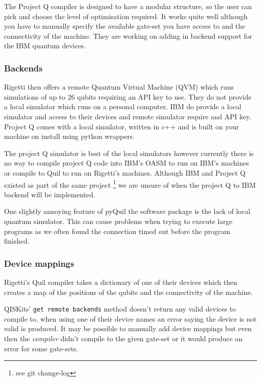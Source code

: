 The Project Q compiler is designed to have a modular structure, so the user can pick and choose the level of optimisation required. It works quite well although you have to manually specify the available gate-set you have access to and the connectivity of the machine. They are working on adding in backend support for the IBM quantum devices.


\subsubsection{Backends}

Rigetti then offers a remote Quantum Virtual Machine (QVM) which runs simulations of up to 26 qubits requiring an API key to use. They do not provide a local simulator which runs on a personal computer. IBM do provide a local simulator and access to their devices and remote simulator require and API key. Project Q comes with a local simulator, written in c++ and is built on your machine on install using python wrappers.

The project Q simulator is best of the local simulators however currently there is no way to compile project Q code into IBM's OASM to run on IBM's machines or compile to Quil to run on Rigetti's machines. Although IBM and Project Q existed as part of the same project \footnote{see git change-log} we are unsure of when the project Q to IBM backend will be implemented. 

One slightly annoying feature of pyQuil the software package is the lack of local quantum simulator. This can cause problems when trying to execute large programs as we often found the connection timed out before the program finished. 

\subsubsection{Device mappings}

Rigetti's Quil compiler takes a dictionary of one of their devices which then creates a map of the positions of the qubits and the connectivity of the machine. 

QISKits' \texttt{get remote backends} method doesn't return any valid devices to compile to, when using one of their device names an error saying the device is not valid is produced. It may be possible to manually add device mappings but even then the \textit{compiler} didn't compile to the given gate-set or it would produce an error for some gate-sets.

